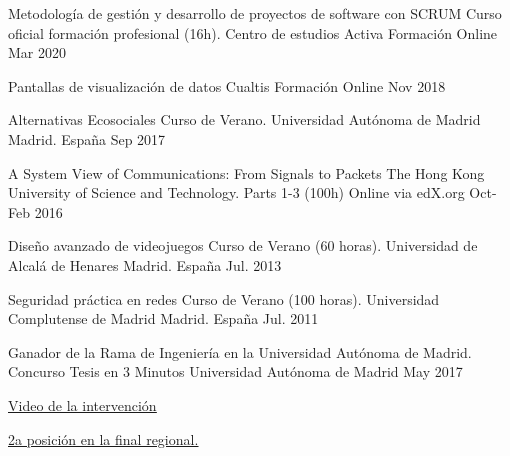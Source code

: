 \begin{cvhonors}
   \cvhonor
	{Metodología de gestión y desarrollo de proyectos de software con SCRUM} %
	{Curso oficial formación profesional (16h). Centro de estudios Activa Formación} %
	{Online} %
	{Mar 2020} %

   \cvhonor
	{Pantallas de visualización de datos} %
	{Cualtis Formación}
	{Online} %
	{Nov 2018} %

   \cvhonor
	{Alternativas Ecosociales} %
	{Curso de Verano. Universidad Autónoma de Madrid}
	{Madrid. España} %
	{Sep 2017} %

	\cvhonor
	{A System View of Communications: From Signals to Packets} %
	{The Hong Kong University of Science and Technology. Parts 1-3 (100h)}
	{Online via edX.org} %
	{Oct-Feb 2016} %
	
	\cvhonor
	{Diseño avanzado de videojuegos} %
	{Curso de Verano (60 horas). Universidad de Alcalá de Henares}
	{Madrid. España} %
	{Jul. 2013} %
	
	\cvhonor
	{Seguridad práctica en redes} %
	{Curso de Verano (100 horas). Universidad Complutense de Madrid}
	{Madrid. España} %
	{Jul. 2011} %
\end{cvhonors}

\begin{cventries}
  \cventry
    {Ganador de la Rama de Ingeniería en la Universidad Autónoma de Madrid.} %
    {Concurso Tesis en 3 Minutos} %
    {Universidad Autónoma de Madrid} %
    {May 2017} %
    {
      \begin{cvitems} %
		\item {\underline{\href{https://www.youtube.com/watch?v=YwiQ177Gk-o}{Video de la intervención}}}
        \item {\underline{\href{https://www.campusenergiainteligente.es/wp-content/uploads/Resolucion_Premios_3MT_2017_con_firmas.pdf}{2a posición en la final regional.}}}
      \end{cvitems}
    }
\end{cventries} 